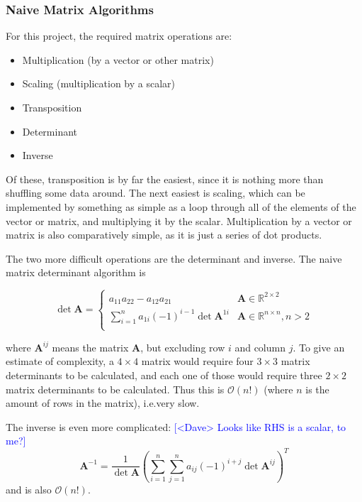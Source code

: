 \documentclass[12pt]{article}
\newcommand{\note}[2][red]{\textcolor{#1}{#2}}
\newcommand{\notedme}[1]{\note[blue]{[<Dave> #1]}}
\begin{document}
\subsubsection{Naive Matrix Algorithms}
\label{naive}

For this project, the required matrix operations are:

\begin{itemize}
	\item Multiplication (by a vector or other matrix)
	\item Scaling (multiplication by a scalar)
	\item Transposition
	\item Determinant
	\item Inverse
\end{itemize}

Of these, transposition is by far the easiest, since it is nothing more than shuffling some data around. The next easiest is scaling, which can be implemented by something as simple as a loop through all of the elements of the vector or matrix, and multiplying it by the scalar. Multiplication by a vector or matrix is also comparatively simple, as it is just a series of dot products.

The two more difficult operations are the determinant and inverse. The naive matrix determinant algorithm \cite{strang2006linear} is

\begin{equation}
	\det{\mathbf{A}} = 
	\begin{cases}
	a_{11}a_{22} - a_{12}a_{21}& \mathbf{A} \in \mathbb{R}^{2 \times 2}\\
	\sum_{i=1}^{n} a_{1i}  (-1)^{i-1}\det{\mathbf{A}^{1i}} & \mathbf{A} \in \mathbb{R}^{n \times n}, n > 2\\
	\end{cases}
\end{equation}

\noindent
where $\mathbf{A}^{ij}$ means the matrix $\mathbf{A}$, but excluding row $i$ and column $j$. To give an estimate of complexity, a $4\times4$ matrix would require four $3\times3$ matrix determinants to be calculated, and each one of those would require three $2\times2$ matrix determinants to be calculated. Thus this is $\mathcal{O}(n!)$ (where $n$ is the amount of rows in the matrix), i.e.\@ very slow.

The inverse is even more complicated: \notedme{Looks like RHS is a scalar, to me?}
\begin{equation}
	\mathbf{A}^{-1} = \frac{1}{\det{\mathbf{A}}} \left(\sum_{i=1}^{n} \sum_{j=1}^{n} a_{ij} (-1)^{i+j} \det{\mathbf{A}^{ij}}\right)^T
\end{equation}
\noindent
and is also $\mathcal{O}(n!)$.
\end{document}
